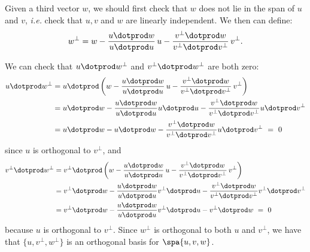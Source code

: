 Given a third vector $w$, we should first check that $w$ does not lie in the span of $u$ and $v$, \textit{i.e.} check that $u,v$ and $w$ are linearly independent.   We then can define:
\[
w^\perp = w - \frac{u\dotprod w}{u\dotprod u}\,u - \frac{v^\perp\dotprod w}{v^\perp\dotprod v^\perp}\,v^\perp.
\]

We can check that \(u \dotprod w^\perp\) and \(v^\perp \dotprod w^\perp\) are both zero:
\begin{align*}
u \dotprod w^\perp&=u \dotprod \left(w - \frac{u\dotprod w}{u\dotprod u}\,u - \frac{v^\perp\dotprod w}{v^\perp\dotprod v^\perp}\,v^\perp \right)\\&= u\dotprod w - \frac{u \dotprod w}{u \dotprod u}u \dotprod u - \frac{v^\perp \dotprod w}{v^\perp \dotprod v^\perp} u \dotprod v^\perp \\
&=u\dotprod w-u\dotprod w-\frac{v^\perp \dotprod w}{v^\perp \dotprod v^\perp} u \dotprod v^\perp\ =\ 0
\end{align*}
since \(u\) is orthogonal to \(v^\perp\), and
\begin{align*}
v^\perp \dotprod w^\perp&=v^\perp \dotprod \left(w - \frac{u\dotprod w}{u\dotprod u}\,u - \frac{v^\perp\dotprod w}{v^\perp\dotprod v^\perp}\,v^\perp \right)\\ &=v^\perp\dotprod w - \frac{u \dotprod w}{u \dotprod u}v^\perp \dotprod u - \frac{v^\perp \dotprod w}{v^\perp \dotprod v^\perp} v^\perp \dotprod v^\perp \\
&=v^\perp\dotprod w-\frac{u \dotprod w}{u \dotprod u}v^\perp \dotprod u - v^\perp \dotprod w\ =\ 0
\end{align*}
because \(u\) is orthogonal to \(v^\perp\). Since $w^\perp$ is orthogonal to both $u$ and $v^\perp$, we have that $\{u,v^\perp,w^\perp \}$ is an orthogonal basis for $\spa \{u,v,w\}$.

